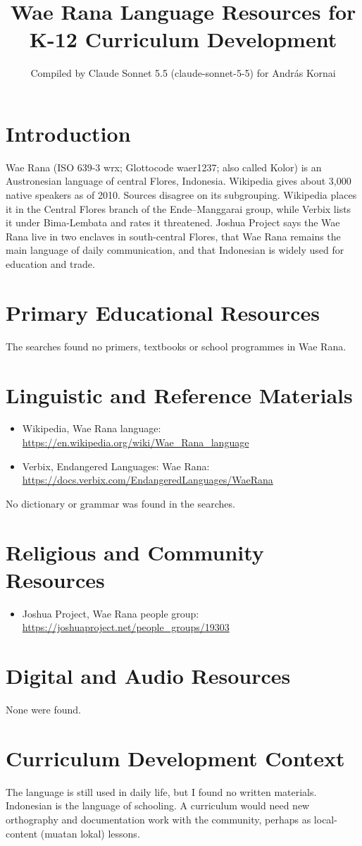 \documentclass[12pt]{article}
\title{Wae Rana Language Resources for K-12 Curriculum Development}
\author{Compiled by Claude Sonnet 5.5 (claude-sonnet-5-5) for Andr\'as Kornai}
\date{}
\begin{document}
\maketitle

\section{Introduction}
Wae Rana (ISO 639-3 wrx; Glottocode waer1237; also called Kolor) is an Austronesian language of central Flores, Indonesia. Wikipedia gives about 3,000 native speakers as of 2010. Sources disagree on its subgrouping. Wikipedia places it in the Central Flores branch of the Ende--Manggarai group, while Verbix lists it under Bima-Lembata and rates it threatened. Joshua Project says the Wae Rana live in two enclaves in south-central Flores, that Wae Rana remains the main language of daily communication, and that Indonesian is widely used for education and trade.

\section{Primary Educational Resources}
The searches found no primers, textbooks or school programmes in Wae Rana.

\section{Linguistic and Reference Materials}
\begin{itemize}
\item Wikipedia, Wae Rana language: \url{https://en.wikipedia.org/wiki/Wae_Rana_language}
\item Verbix, Endangered Languages: Wae Rana: \url{https://docs.verbix.com/EndangeredLanguages/WaeRana}
\end{itemize}
No dictionary or grammar was found in the searches.

\section{Religious and Community Resources}
\begin{itemize}
\item Joshua Project, Wae Rana people group: \url{https://joshuaproject.net/people_groups/19303}
\end{itemize}

\section{Digital and Audio Resources}
None were found.

\section{Curriculum Development Context}
The language is still used in daily life, but I found no written materials. Indonesian is the language of schooling. A curriculum would need new orthography and documentation work with the community, perhaps as local-content (muatan lokal) lessons.
\end{document}
